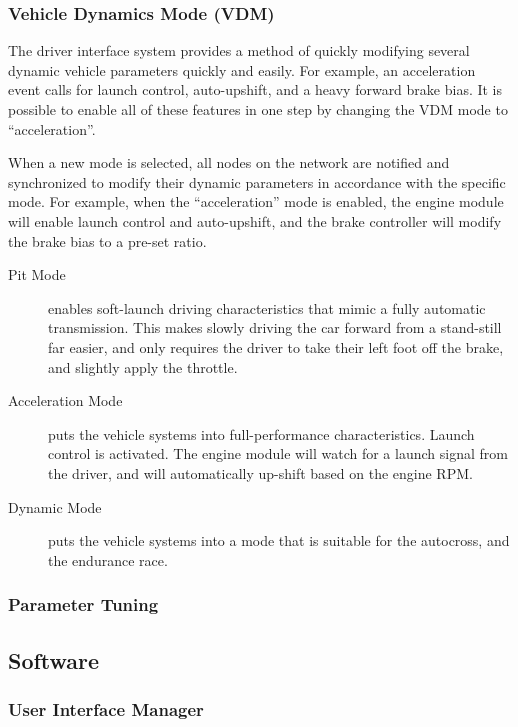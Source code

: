 \subsubsection{Vehicle Dynamics Mode (VDM)}

The driver interface system provides a method of quickly modifying several dynamic vehicle parameters quickly and easily. For example, an acceleration event calls for launch control, auto-upshift, and a heavy forward brake bias. It is possible to enable all of these features in one step by changing the VDM mode to {}``acceleration''. 

When a new mode is selected, all nodes on the network are notified and synchronized to modify their dynamic parameters in accordance with the specific mode. For example, when the  {}``acceleration'' mode is enabled, the engine module will enable launch control and auto-upshift, and the brake controller will modify the brake bias to a pre-set ratio.

\begin{description}
  \item [{Pit Mode}] enables soft-launch driving characteristics that mimic a fully automatic transmission. This makes slowly driving the car forward from a stand-still far easier, and only requires the driver to take their left foot off the brake, and slightly apply the throttle.
  \item [{Acceleration Mode}] puts the vehicle systems into full-performance characteristics. Launch control is activated. The engine module will watch for a launch signal from the driver, and will automatically up-shift based on the engine RPM.
  \item [{Dynamic Mode}] puts the vehicle systems into a mode that is suitable for the autocross, and the endurance race.
\end{description}


\subsubsection{Parameter Tuning}


\subsection{Software}


\subsubsection{User Interface Manager}


